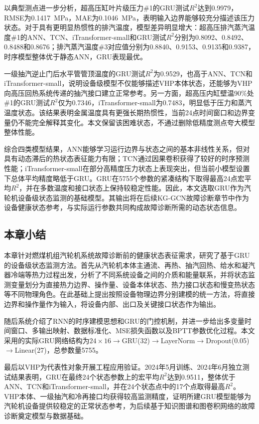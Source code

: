 以典型测点进一步分析，超高压缸叶片级压力\#1的GRU测试$R^2$达到0.9979，RMSE为0.1417~MPa，MAE为0.1046~MPa，表明输入边界能够较充分描述该压力状态。对于具有更明显热惯性的排汽温度，模型差异明显增大：超高压排汽蒸汽温度\#1的ANN、TCN、iTransformer-small和GRU测试$R^2$分别为0.8092、0.8492、0.8488和0.8676；排汽蒸汽温度\#3对应值分别为0.8840、0.9153、0.9135和0.9387，时序模型整体优于静态ANN，GRU表现最优。

一级抽汽逆止门后水平管管顶温度的GRU测试$R^2$为0.9529，也高于ANN、TCN和iTransformer-small，说明设备级模型不仅能够描述VHP本体状态，还能够为VHP向高压回热系统传递的抽汽接口建立正常参考。另一方面，超高压内缸壁温90\%处\#1的GRU测试$R^2$仅为0.7346，iTransformer-small为0.7483，明显低于压力和蒸汽温度状态。该结果表明金属温度具有更强长期热惯性，当前24点时间窗口和边界变量仍不能完全解释其变化。本文保留该困难状态，不通过删除低精度测点夸大模型整体性能。

综合四类模型结果，ANN能够学习运行边界与状态之间的基本非线性关系，但对具有动态滞后的热状态表征能力有限；TCN通过因果卷积获得了较好的时序预测性能；iTransformer-small在部分高精度压力状态上表现突出，但当前小模型设置下总体平均精度略低于GRU。GRU在5755个参数的紧凑结构下取得最高24点宏平均$R^2$，并在多数温度和接口状态上保持较稳定性能。因此，本文选取GRU作为汽轮机设备级状态监测的基础模型。其输出将在后续KG-GCN故障诊断章节中作为设备健康状态参考，与实际运行参数共同构成故障诊断所需的动态状态信息。

\subsection{本章小结}

本章针对燃煤机组汽轮机系统故障诊断前的健康状态表征需求，研究了基于GRU的设备级状态监测方法。首先从汽轮机本体主通流、再热、抽汽回热、给水和凝汽器冷端等热力过程出发，分析了不同系统设备之间的介质和能量联系，并将状态监测变量划分为直接热力边界、操作量、设备本体状态、热力接口状态和慢变热状态等不同物理角色。在此基础上提出按照设备物理边界分别建模的统一方法，将直接边界和操作量作为输入，将设备内部、出口及关键接口状态作为输出。

随后系统介绍了RNN的时序建模思想和GRU的门控机制，并进一步给出多变量时间窗口、多输出映射、数据标准化、MSE损失函数以及BPTT参数优化过程。本文采用的实际GRU网络结构为$24\times16\rightarrow$GRU(32)$\rightarrow$LayerNorm$\rightarrow$Dropout(0.05)$\rightarrow$Linear(27)，总参数量5755。

最后以VHP为代表性对象开展工程应用验证。2024年5月训练、2024年6月独立测试结果表明，GRU在最终24个状态参数上的宏平均$R^2$达到0.9511，整体优于ANN、TCN和iTransformer-small，并在24个状态点中的17个点取得最高$R^2$。VHP本体、一级抽汽和冷再接口均获得较高监测精度，证明所建GRU模型能够为汽轮机设备提供较稳定的正常状态参考，为后续基于知识图谱和图卷积网络的故障诊断奠定模型与数据基础。